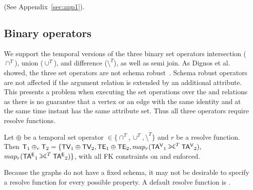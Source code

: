   (See Appendix~\ref{sec:app1}).


\subsection{Binary operators}
\label{sec:algebra:binary}

We support the temporal versions of the three binary set operators
intersection ($\cap^T$), union ($\cup^T$), and difference
($\setminus^T$), as well as semi join.  As Dignos et al. showed, the
three set operators are not schema robust~\cite{Dignos2012}.  Schema
robust operators are not affected if the argument relation is extended
by an additional attribute.  This presents a problem when executing
the set operations over the \tav and \tae relations as there is no
guarantee that a vertex or an edge with the same identity and at the
same time instant has the same attribute set.  Thus all three
operators require resolve functions.

\begin{definition}
Let $\oplus$ be a temporal set operator $\in \{ \cap^T, \cup^T,
\setminus^T \}$ and $r$ be a resolve function.  Then $\tve_1 \oplus_r
\tve_2 = \{ \tv_1 \oplus \tv_2, \te_1 \oplus \te_2, map_r(\tav_1
\fullouterjoin^T \tav_2),$\\ $map_r(\tae_1 \fullouterjoin^T \tae_2)
\}$, with all FK constraints on \tav and \tae enforced.
\label{def:sets}
\end{definition}

Because the graphs do not have a fixed schema, it may not be desirable
to specify a resolve function for every possible property.  A default
resolve function is .


